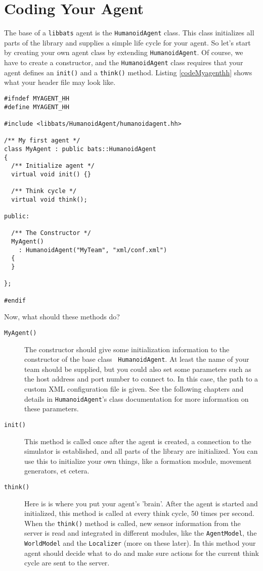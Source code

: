 \newpage
\section{Coding Your Agent}
\label{sec:coding-your-agent}

The base of a {\tt libbats} agent is the {\tt HumanoidAgent}
class. This class initializes all parts of the library and supplies a
simple life cycle for your agent. So let's start by creating your own
agent class by extending {\tt HumanoidAgent}. Of course, we have to
create a constructor, and the {\tt HumanoidAgent} class requires that
your agent defines an {\tt init()} and a {\tt think()} method. Listing
\ref{codeMyagenthh} shows what your header file may look like.

\begin{lstlisting}[float,caption={\tt myagent.hh},label=codeMyagenthh,frame=single]
#ifndef MYAGENT_HH
#define MYAGENT_HH

#include <libbats/HumanoidAgent/humanoidagent.hh>

/** My first agent */
class MyAgent : public bats::HumanoidAgent
{
  /** Initialize agent */
  virtual void init() {}
  
  /** Think cycle */
  virtual void think();
  
public:

  /** The Constructor */
  MyAgent()
    : HumanoidAgent("MyTeam", "xml/conf.xml")
  {
  }

};

#endif
\end{lstlisting}

Now, what should these methods do?
\begin{description}
\item[{\tt MyAgent()}] The constructor should give some initialization
  information to the constructor of the base class {\tt
    HumanoidAgent}. At least the name of your team should be supplied,
  but you could also set some parameters such as the host address and
  port number to connect to. In this case, the path to a custom XML configuration file is given. See the following chapters and details in
  {\tt HumanoidAgent}'s class documentation for more information on
  these parameters.
\item[{\tt init()}] This method is called once after the agent is created, a connection to the simulator is established, and all parts of the library are initialized. You can use this to initialize your own things, like a formation module, movement generators, et cetera.
\item[{\tt think()}] Here is is where you put your agent's 'brain'. After the agent is started and initialized, this method is called at every think cycle, 50 times per second. When the {\tt think()} method is called, new sensor information from the server is read and integrated in different modules, like the {\tt AgentModel}, the {\tt WorldModel} and the {\tt Localizer} (more on these later). In this method your agent should decide what to do and make sure actions for the current think cycle are sent to the server.
\end{description}

